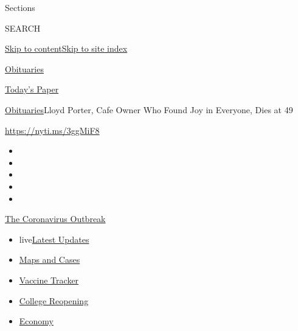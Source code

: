 Sections

SEARCH

\protect\hyperlink{site-content}{Skip to
content}\protect\hyperlink{site-index}{Skip to site index}

\href{https://www.nytimes.com/section/obituaries}{Obituaries}

\href{https://myaccount.nytimes.com/auth/login?response_type=cookie\&client_id=vi}{}

\href{https://www.nytimes.com/section/todayspaper}{Today's Paper}

\href{/section/obituaries}{Obituaries}\textbar{}Lloyd Porter, Cafe Owner
Who Found Joy in Everyone, Dies at 49

\url{https://nyti.ms/3ggMiF8}

\begin{itemize}
\item
\item
\item
\item
\item
\end{itemize}

\href{https://www.nytimes.com/news-event/coronavirus?action=click\&pgtype=Article\&state=default\&region=TOP_BANNER\&context=storylines_menu}{The
Coronavirus Outbreak}

\begin{itemize}
\tightlist
\item
  live\href{https://www.nytimes.com/2020/08/03/world/coronavirus-covid-19.html?action=click\&pgtype=Article\&state=default\&region=TOP_BANNER\&context=storylines_menu}{Latest
  Updates}
\item
  \href{https://www.nytimes.com/interactive/2020/us/coronavirus-us-cases.html?action=click\&pgtype=Article\&state=default\&region=TOP_BANNER\&context=storylines_menu}{Maps
  and Cases}
\item
  \href{https://www.nytimes.com/interactive/2020/science/coronavirus-vaccine-tracker.html?action=click\&pgtype=Article\&state=default\&region=TOP_BANNER\&context=storylines_menu}{Vaccine
  Tracker}
\item
  \href{https://www.nytimes.com/2020/08/02/us/covid-college-reopening.html?action=click\&pgtype=Article\&state=default\&region=TOP_BANNER\&context=storylines_menu}{College
  Reopening}
\item
  \href{https://www.nytimes.com/live/2020/08/03/business/stock-market-today-coronavirus?action=click\&pgtype=Article\&state=default\&region=TOP_BANNER\&context=storylines_menu}{Economy}
\end{itemize}

